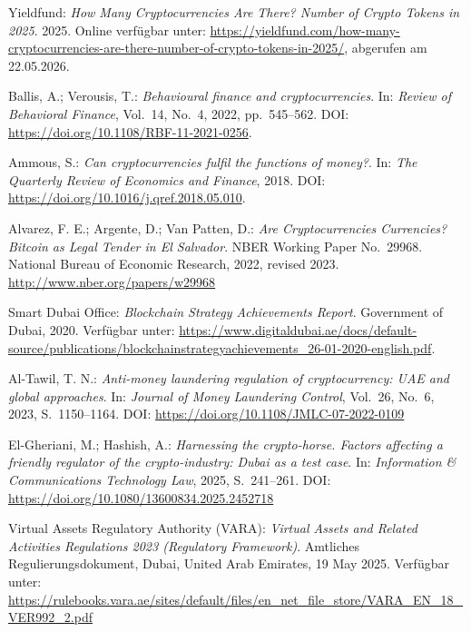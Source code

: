 \begin{thebibliography}{}

\label{yieldfund_crypto2025}
Yieldfund: \textit{How Many Cryptocurrencies Are There? Number of Crypto Tokens in 2025}. 2025. Online verfügbar unter: \url{https://yieldfund.com/how-many-cryptocurrencies-are-there-number-of-crypto-tokens-in-2025/}, abgerufen am 22.05.2026.

\label{Ballis2022}
Ballis, A.; Verousis, T.: \textit{Behavioural finance and cryptocurrencies}. In: \textit{Review of Behavioral Finance}, Vol.~14, No.~4, 2022, pp.~545--562. DOI: \url{https://doi.org/10.1108/RBF-11-2021-0256}.

\label{Ammous2018}
Ammous, S.: \textit{Can cryptocurrencies fulfil the functions of money?}. In: \textit{The Quarterly Review of Economics and Finance}, 2018. DOI: \url{https://doi.org/10.1016/j.qref.2018.05.010}.

\label{Alvarez2023}
Alvarez, F. E.; Argente, D.; Van Patten, D.: \textit{Are Cryptocurrencies Currencies? Bitcoin as Legal Tender in El Salvador}. NBER Working Paper No.~29968. National Bureau of Economic Research, 2022, revised 2023. \url{http://www.nber.org/papers/w29968}
 
\label{DubaiBlockchain2020}
Smart Dubai Office: \textit{Blockchain Strategy Achievements Report}. Government of Dubai, 2020. Verfügbar unter: \url{https://www.digitaldubai.ae/docs/default-source/publications/blockchainstrategyachievements_26-01-2020-english.pdf}.
 
\label{AlTawil2023}
Al-Tawil, T. N.: \textit{Anti-money laundering regulation of cryptocurrency: UAE and global approaches}. In: \textit{Journal of Money Laundering Control}, Vol.~26, No.~6, 2023, S.~1150--1164. DOI: \url{https://doi.org/10.1108/JMLC-07-2022-0109}
 
\label{ElGheriani2025}
El-Gheriani, M.; Hashish, A.: \textit{Harnessing the crypto-horse. Factors affecting a friendly regulator of the crypto-industry: Dubai as a test case}. In: \textit{Information \& Communications Technology Law}, 2025, S.~241--261. DOI: \url{https://doi.org/10.1080/13600834.2025.2452718}
 
\label{VARA2025}
Virtual Assets Regulatory Authority (VARA): \textit{Virtual Assets and Related Activities Regulations 2023 (Regulatory Framework)}. Amtliches Regulierungsdokument, Dubai, United Arab Emirates, 19 May 2025. Verfügbar unter: \url{https://rulebooks.vara.ae/sites/default/files/en_net_file_store/VARA_EN_18_VER992_2.pdf}


\end{thebibliography}
